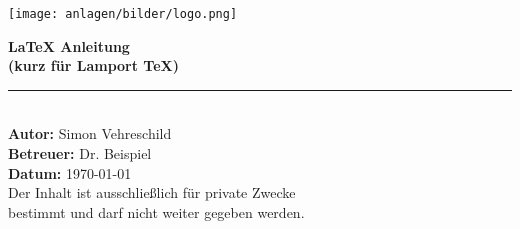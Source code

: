 \begin{titlepage}  %
    \begin{center}

        \vspace*{0.5cm}  %

        \texttt{[image: anlagen/bilder/logo.png]}
        \vspace{1cm}  %

        {\Huge \textbf{LaTeX Anleitung}} \\[0.5cm]
        {\Large \textbf{(kurz für Lamport TeX)}} \\[1.5cm]

        \rule{12cm}{0.5pt} \\[1.5cm]  %

        \textbf{\Large Autor:} \Large Simon Vehreschild \\[0.5cm]
        \textbf{\Large Betreuer:} \Large Dr. Beispiel \\[0.5cm]
        \textbf{\Large Datum:} \Large \today \\[3cm]

        {Der Inhalt ist ausschließlich für private Zwecke} \\
        {bestimmt und darf nicht weiter gegeben werden.} \\

        \vfill  %
    \end{center}
\end{titlepage}